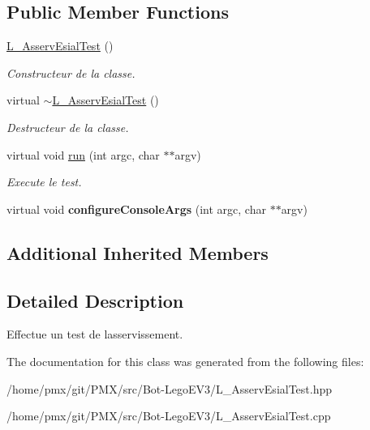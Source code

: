 \subsection*{Public Member Functions}
\begin{DoxyCompactItemize}
\item 
\mbox{\label{classL__AsservEsialTest_a957d37f48d8330e22e88e1d9bbe1b1af}} 
\hyperlink{classL__AsservEsialTest_a957d37f48d8330e22e88e1d9bbe1b1af}{L\+\_\+\+Asserv\+Esial\+Test} ()
\begin{DoxyCompactList}\small\item\em Constructeur de la classe. \end{DoxyCompactList}\item 
\mbox{\label{classL__AsservEsialTest_a54256fd053993ebb8412452a7ce02f40}} 
virtual \hyperlink{classL__AsservEsialTest_a54256fd053993ebb8412452a7ce02f40}{$\sim$\+L\+\_\+\+Asserv\+Esial\+Test} ()
\begin{DoxyCompactList}\small\item\em Destructeur de la classe. \end{DoxyCompactList}\item 
\mbox{\label{classL__AsservEsialTest_a4edc54bd068ceb00479b87cdb9b5d8c5}} 
virtual void \hyperlink{classL__AsservEsialTest_a4edc54bd068ceb00479b87cdb9b5d8c5}{run} (int argc, char $\ast$$\ast$argv)
\begin{DoxyCompactList}\small\item\em Execute le test. \end{DoxyCompactList}\item 
\mbox{\label{classL__AsservEsialTest_a8788d8c2062ebf589920034744dce040}} 
virtual void {\bfseries configure\+Console\+Args} (int argc, char $\ast$$\ast$argv)
\end{DoxyCompactItemize}
\subsection*{Additional Inherited Members}


\subsection{Detailed Description}
Effectue un test de l\textquotesingle{}asservissement. 

The documentation for this class was generated from the following files\+:\begin{DoxyCompactItemize}
\item 
/home/pmx/git/\+P\+M\+X/src/\+Bot-\/\+Lego\+E\+V3/L\+\_\+\+Asserv\+Esial\+Test.\+hpp\item 
/home/pmx/git/\+P\+M\+X/src/\+Bot-\/\+Lego\+E\+V3/L\+\_\+\+Asserv\+Esial\+Test.\+cpp\end{DoxyCompactItemize}
